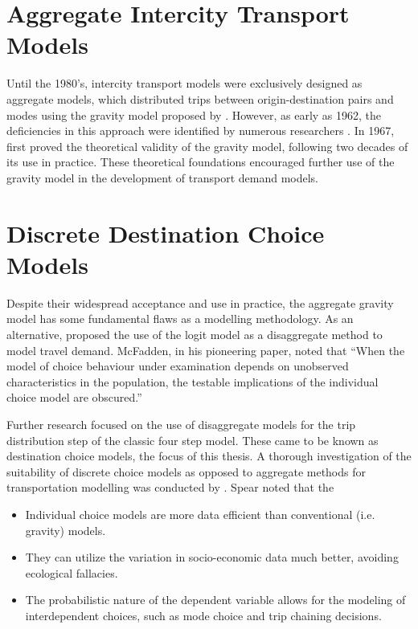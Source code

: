 \section{Aggregate Intercity Transport Models}

Until the 1980’s, intercity transport models were exclusively designed as aggregate models, which distributed trips between origin-destination pairs and modes using the gravity model proposed by \autocite{casey55}. However, as early as 1962, the deficiencies in this approach were identified by numerous researchers \autocite*{OiSchu62, Warner62}. In 1967, \autocite{Wilson67} first proved the theoretical validity of the gravity model, following two decades of its use in practice. These theoretical foundations encouraged further use of the gravity model in the development of transport demand models. 

\section{Discrete Destination Choice Models}
Despite their widespread acceptance and use in practice, the aggregate gravity model has some fundamental flaws as a modelling methodology. As an alternative, \textcite*{McFadden73, Akiva74} proposed the use of the logit model as a disaggregate method to model travel demand. McFadden, in his pioneering paper, noted that \enquote{When the model of choice behaviour under examination depends on unobserved characteristics in the population, the testable implications of the individual choice model are obscured.}\parencite{McFadden73}

Further research focused on the use of disaggregate models for the trip distribution step of the classic four step model. These came to be known as destination choice models, the focus of this thesis. A thorough investigation of the suitability of discrete choice models as opposed to aggregate methods for transportation modelling was conducted by \textcite{Spear77}. Spear noted that the 
\begin{itemize}
\item Individual choice models are more data efficient than conventional (i.e. gravity) models.
\item They can utilize the variation in socio-economic data much better, avoiding ecological fallacies.
\item The probabilistic nature of the dependent variable allows for the modeling of interdependent choices, such as mode choice and trip chaining decisions. 
\end{itemize}
	
